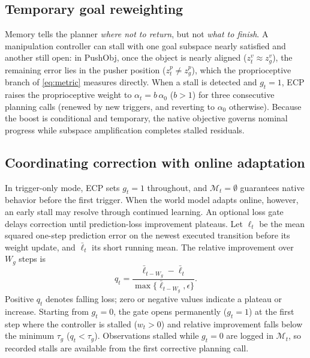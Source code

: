\subsection{Temporary goal reweighting}
\label{sec:weighting}
Memory tells the planner \emph{where not to return}, but not \emph{what to finish}. A manipulation controller can stall with one goal subspace nearly satisfied and another still open: in PushObj, once the object is nearly aligned ($z_t^v\approx z_g^v$), the remaining error lies in the pusher position ($z_t^p\neq z_g^p$), which the proprioceptive branch of \cref{eq:metric} measures directly. When a stall is detected and $g_t=1$, ECP raises the proprioceptive weight to $\alpha_t=b\,\alpha_0$ ($b>1$) for three consecutive planning calls (renewed by new triggers, and reverting to $\alpha_0$ otherwise). Because the boost is conditional and temporary, the native objective governs nominal progress while subspace amplification completes stalled residuals.

\subsection{Coordinating correction with online adaptation}
\label{sec:gate}
In trigger-only mode, ECP sets $g_t=1$ throughout, and $\mathcal M_t=\emptyset$ guarantees native behavior before the first trigger. When the world model adapts online, however, an early stall may resolve through continued learning. An optional loss gate delays correction until prediction-loss improvement plateaus. Let $\ell_t$ be the mean squared one-step prediction error on the newest executed transition before its weight update, and $\bar\ell_t$ its short running mean. The relative improvement over $W_g$ steps is
\begin{equation}
 q_t=\frac{\bar\ell_{t-W_g}-\bar\ell_t}
 {\max\{\bar\ell_{t-W_g},\epsilon\}}.
 \label{eq:gate}
\end{equation}
Positive $q_t$ denotes falling loss; zero or negative values indicate a plateau or increase. Starting from $g_t=0$, the gate opens permanently ($g_t=1$) at the first step where the controller is stalled ($w_t>0$) and relative improvement falls below the minimum $\tau_g$ ($q_t<\tau_g$). Observations stalled while $g_t=0$ are logged in $\mathcal M_t$, so recorded stalls are available from the first corrective planning call.

